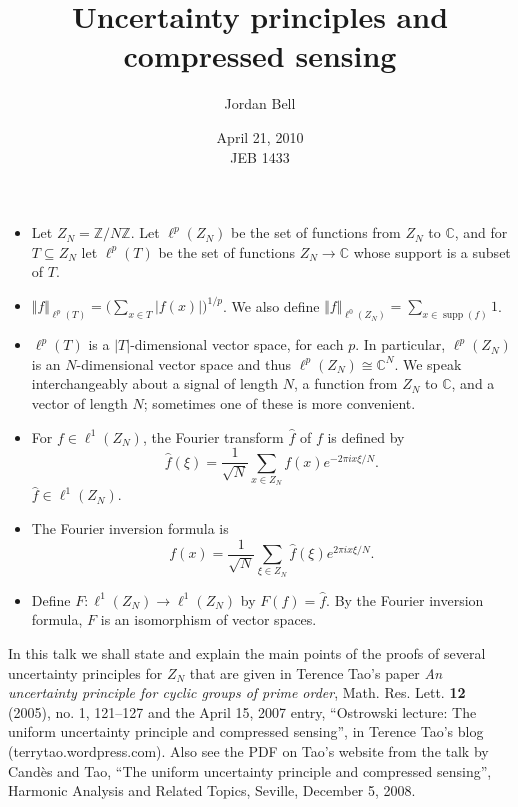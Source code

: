 \documentclass{slides}
\newcommand{\norm}[1]{\Vert #1 \Vert}
\DeclareMathOperator{\supp}{supp}
\begin{document}
\title{Uncertainty principles and compressed sensing}
\author{Jordan Bell}
\date{April 21, 2010\\JEB 1433}
\maketitle

\begin{slide}
\begin{itemize}
\item Let $Z_N=\mathbb{Z}/N\mathbb{Z}$. Let $\ell^p(Z_N)$ be the set of
functions from $Z_N$ to $\mathbb{C}$, and for $T \subseteq Z_N$ let
$\ell^p(T)$ be the set of functions $Z_N \to \mathbb{C}$
whose support is a subset of $T$.

\item $\norm{f}_{\ell^p(T)}=\big(\sum_{x \in T} |f(x)| \big)^{1/p}$.
We also define $\norm{f}_{\ell^0(Z_N)}=\sum_{x \in \supp(f)} 1$.

\item $\ell^p(T)$ is a $|T|$-dimensional vector space, for each $p$. In particular,
$\ell^p(Z_N)$ is an $N$-dimensional vector space and thus 
$\ell^p(Z_N) \cong \mathbb{C}^N$. We speak interchangeably about a signal
of length $N$, a function from $Z_N$ to $\mathbb{C}$, and a vector
of length $N$; sometimes one of these is more convenient.
\end{itemize}
\end{slide}

\begin{slide}
\begin{itemize}
\item For $f \in \ell^1(Z_N)$, the Fourier transform $\hat{f}$ of
$f$ is defined by
\[
\hat{f}(\xi)=\frac{1}{\sqrt{N}}\sum_{x \in Z_N} f(x)e^{-2\pi ix\xi/N}.
\]
$\hat{f} \in \ell^1(Z_N)$.

\item The Fourier inversion formula is
\[
f(x)=\frac{1}{\sqrt{N}}\sum_{\xi \in Z_N} \hat{f}(\xi)e^{2\pi ix\xi/N}.
\]

\item Define $F:\ell^1(Z_N) \to \ell^1(Z_N)$ by $F(f)=\hat{f}$. By the Fourier
inversion formula, $F$ is an isomorphism of vector spaces.
\end{itemize}
\end{slide}

\begin{slide}
In this talk we shall state and explain the main points of the proofs
of several uncertainty principles for $Z_N$ that are given
in Terence Tao's paper {\em An uncertainty principle for cyclic groups of prime order}, Math. Res. Lett. \textbf{12} (2005), no. 1, 121--127
and the April 15, 2007 entry, ``Ostrowski lecture: The uniform uncertainty
principle and compressed sensing'', in Terence Tao's blog (terrytao.wordpress.com).
Also see the PDF on Tao's website from the talk by Cand\`es and Tao,
``The uniform uncertainty principle and compressed sensing'',
Harmonic Analysis and Related Topics, Seville, December 5, 2008.
\end{slide}
\end{document}
